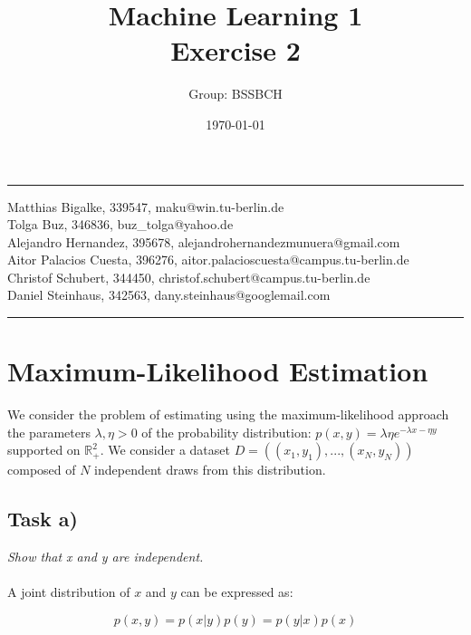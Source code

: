 \documentclass{article}
\title{Machine Learning 1 \\ Exercise 2} %
\author{Group: BSSBCH} %
\date{\today} %
\begin{document}
\maketitle %
\noindent\rule[0.5ex]{\linewidth}{1pt}
Matthias Bigalke, 339547, maku@win.tu-berlin.de \\
Tolga Buz, 346836, buz\_tolga@yahoo.de \\
Alejandro Hernandez, 395678, alejandrohernandezmunuera@gmail.com \\
Aitor Palacios Cuesta, 396276, aitor.palacioscuesta@campus.tu-berlin.de \\
Christof Schubert, 344450, christof.schubert@campus.tu-berlin.de \\
Daniel Steinhaus, 342563, dany.steinhaus@googlemail.com\\
\noindent\rule[0.5ex]{\linewidth}{1pt}


\section{Maximum-Likelihood Estimation}

We consider the problem of estimating using the maximum-likelihood approach the parameters $\lambda, \eta > 0$ of the probability
distribution: $p(x, y) = \lambda\eta e ^ {- \lambda x - \eta y}$ supported on $\mathbb{R}^2_+$. We consider a dataset $D = ((x_1, y_1), . . . ,(x_N , y_N ))$ composed of $N$ independent draws from this
distribution.

\subsection*{Task a)}

\textit{Show that x and y are independent.}\\
\\
A joint distribution of $x$ and $y$ can be expressed as:

\begin{equation}
p(x,y) = p(x|y)p(y) = p(y|x)p(x) 
\end{equation}
\end{document}

